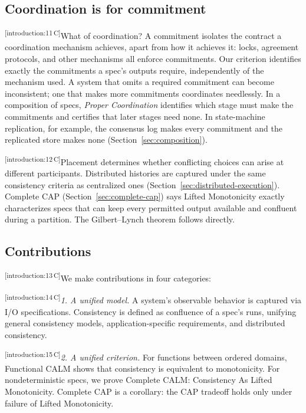 \documentclass[sigconf]{cidr-2027}
\theoremstyle{remark}
\newcommand{\commitment}{commitment\xspace}
\newcommand{\commitments}{commitments\xspace}
\newcommand{\spectype}[1][]{I/O specification#1\xspace}
\newcommand{\cxtag}[2]{\textsuperscript{\textsf{\tiny[#1\,#2]}}}
\begin{document}
\subsection{Coordination is for \commitment}
\color{black!45}\cxtag{introduction:11}{C}What of coordination?  A \commitment isolates the contract a coordination
mechanism achieves, apart from how it achieves it: locks, agreement protocols,
and other mechanisms all enforce \commitments.  Our criterion identifies exactly
the \commitments a spec's outputs require, independently of the mechanism used.
A system that omits a required \commitment can become inconsistent; one that makes more \commitments coordinates needlessly.  In a composition of specs, \emph{Proper Coordination}
identifies which stage must make the \commitments and certifies that later
stages need none.  In state-machine replication, for example, the consensus log
makes every \commitment and the replicated store makes none
(Section~\ref{sec:composition}).\color{black}

\color{black!45}\cxtag{introduction:12}{C}Placement determines whether conflicting choices can arise at different
participants.  Distributed histories are captured under the same consistency criteria as
centralized ones (Section~\ref{sec:distributed-execution}).  Complete CAP
(Section~\ref{sec:complete-cap}) says Lifted Monotonicity exactly characterizes specs
that can keep every permitted output available and confluent during a
partition.  The Gilbert--Lynch theorem follows directly.\color{black}

\subsection{Contributions}
\color{black!45}\cxtag{introduction:13}{C}We make contributions in four categories:\color{black}

\color{black!45}\noindent
\cxtag{introduction:14}{C}\emph{1. A unified model.} A system's observable behavior is captured via
        \spectype[s]. Consistency is defined as
        confluence of a spec's runs, unifying general consistency models,
        application-specific requirements, and distributed consistency.\color{black}

\color{black!45}\noindent
\cxtag{introduction:15}{C}\emph{2. A unified criterion.} For functions between ordered domains,
        Functional CALM shows that consistency is equivalent to monotonicity. For nondeterministic specs,
        we prove Complete CALM: Consistency As Lifted Monotonicity. Complete CAP is a corollary:
        the CAP tradeoff holds only under failure of Lifted Monotonicity.\color{black}
\end{document}
